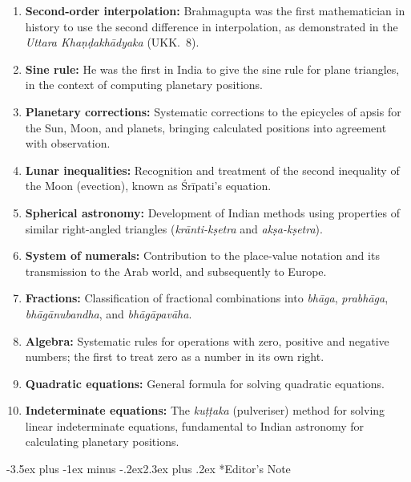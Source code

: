 \documentclass[11pt,a4paper]{article}
\makeatletter
\renewcommand{\section}{\@startsection {section}{1}{\z@}%
  {-3.5ex plus -1ex minus -.2ex}{2.3ex plus .2ex}%
  {\normalfont\Large\bfseries\color{sectioncolor}}}
\makeatother
\begin{document}
\begin{enumerate}[label=\textbf{\arabic*.}]
\item \textbf{Second-order interpolation:} Brahmagupta was the first mathematician in history to use the second difference in interpolation, as demonstrated in the \textit{Uttara Khaṇḍakhādyaka} (UKK.~8).

\item \textbf{Sine rule:} He was the first in India to give the sine rule for plane triangles, in the context of computing planetary positions.

\item \textbf{Planetary corrections:} Systematic corrections to the epicycles of apsis for the Sun, Moon, and planets, bringing calculated positions into agreement with observation.

\item \textbf{Lunar inequalities:} Recognition and treatment of the second inequality of the Moon (evection), known as Śrīpati's equation.

\item \textbf{Spherical astronomy:} Development of Indian methods using properties of similar right-angled triangles (\textit{krānti-kṣetra} and \textit{akṣa-kṣetra}).

\item \textbf{System of numerals:} Contribution to the place-value notation and its transmission to the Arab world, and subsequently to Europe.

\item \textbf{Fractions:} Classification of fractional combinations into \textit{bhāga}, \textit{prabhāga}, \textit{bhāgānubandha}, and \textit{bhāgāpavāha}.

\item \textbf{Algebra:} Systematic rules for operations with zero, positive and negative numbers; the first to treat zero as a number in its own right.

\item \textbf{Quadratic equations:} General formula for solving quadratic equations.

\item \textbf{Indeterminate equations:} The \textit{kuṭṭaka} (pulveriser) method for solving linear indeterminate equations, fundamental to Indian astronomy for calculating planetary positions.
\end{enumerate}

\section*{Editor's Note}
\end{document}
